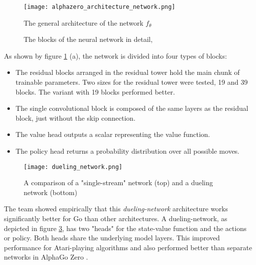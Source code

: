 \begin{figure}
    \centering
    \texttt{[image: alphazero\_architecture\_network.png]}
    \caption{The general architecture of the network $f_{\theta}$ \cite[cf. p. 27ff.]{silver_mastering_2017}}
    \label{alpha_zero_neural_network}
\end{figure}

\begin{figure}[!h]
    \centering
    \hfill
    \hfill
    \caption{The blocks of the neural network in detail, \cite[cf. p. 27ff.]{silver_mastering_2017}}
    \label{alpha_zero_blocks}
\end{figure}

As shown by figure \ref{alpha_zero_neural_network} (a), the network is divided into four types of blocks:

\begin{itemize}
    \item The residual blocks arranged in the residual tower hold the main chunk of trainable parameters. Two sizes for the residual tower were tested, 19 and 39 blocks. The variant with 19 blocks performed better.
    \item The single convolutional block is composed of the same layers as the residual block, just without the skip connection.
    \item The value head outputs a scalar representing the value function.
    \item The policy head returns a probability distribution over all possible moves.
\end{itemize}

\begin{figure}
    \centering
    \texttt{[image: dueling\_network.png]}
    \caption{A comparison of a "single-stream" network (top) and a dueling network (bottom) \cite{wang_dueling_2016}}
    \label{dueling_network}
\end{figure}

The team showed empirically \cite[p. 9]{silver_mastering_2017} that this \textit{dueling-network} \cite{wang_dueling_2016} architecture works significantly better for Go than other architectures. A dueling-network, as depicted in figure \ref{dueling_network}, has two "heads" for the state-value function and the actions or policy. Both heads share the underlying model layers. This improved performance for Atari-playing algorithms \cite[p. 7]{wang_dueling_2016} and also performed better than separate networks in AlphaGo Zero \cite[p. 9]{silver_mastering_2017}.

